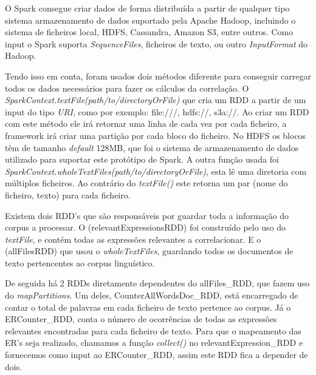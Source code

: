 O Spark consegue criar dados de forma distribuída a partir de qualquer tipo sistema armazenamento de dados  suportado pela Apache Hadoop, incluindo o sistema de ficheiros local, HDFS, Cassandra, Amazon S3, entre outros. Como input o Spark suporta \textit{SequenceFiles}, ficheiros de texto, ou outro \textit{InputFormat} do Hadoop. 

Tendo isso em conta, foram usados dois métodos diferente para conseguir carregar todos os dados necessários para fazer os cálculos da correlação. O \textit{SparkContext.textFile(path/to/directoryOrFile)} que cria um RDD a partir de um input do tipo \textit{URI}, como por exemplo: file:///, hdfs://, s3a://. Ao criar um RDD com este método ele irá retornar uma linha de cada vez por cada ficheiro, a framework irá criar uma partição por cada bloco do ficheiro. No HDFS os blocos têm de tamanho \textit{default} 128MB, que foi o sistema de armazenamento de dados utilizado para suportar este protótipo de Spark.  A outra função usada foi \textit{SparkContext.wholeTextFiles(path/to/directoryOrFile)}, esta lê uma diretoria com múltiplos ficheiros. Ao contrário do \textit{textFile()} este retorna um par (nome do ficheiro, texto) para cada ficheiro.

Existem dois RDD's que são responsáveis por guardar toda a informação do corpus a processar. O (relevantExpressionsRDD) foi construído pelo uso do \textit{textFile}, e contém todas as expressões relevantes a correlacionar. E o (allFilesRDD) que usou o \textit{wholeTextFiles}, guardando todos os documentos de texto pertencentes ao corpus linguístico.

De seguida há 2 RDDs diretamente dependentes do allFiles\_RDD, que fazem uso do \textit{mapPartitions}. Um deles, CounterAllWordsDoc\_RDD, está encarregado de contar o total de palavras em cada ficheiro de texto pertence ao corpus. Já o ERCounter\_RDD, conta o número de ocorrências de todas as expressões relevantes encontradas para cada ficheiro de texto. Para que o mapeamento das ER's seja realizado, chamamos a função \textit{collect()} no relevantExpression\_RDD e fornecemos como input ao ERCounter\_RDD, assim este RDD fica a depender de dois.

